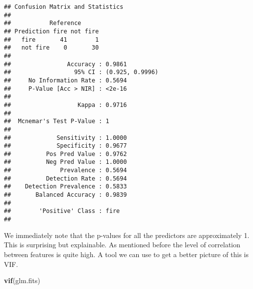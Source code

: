 \documentclass[
]{article}
\newenvironment{Shaded}{\begin{snugshade}}{\end{snugshade}}
\newcommand{\AttributeTok}[1]{\textcolor[rgb]{0.13,0.29,0.53}{#1}}
\newcommand{\CommentTok}[1]{\textcolor[rgb]{0.56,0.35,0.01}{\textit{#1}}}
\newcommand{\DecValTok}[1]{\textcolor[rgb]{0.00,0.00,0.81}{#1}}
\newcommand{\FunctionTok}[1]{\textcolor[rgb]{0.13,0.29,0.53}{\textbf{#1}}}
\newcommand{\NormalTok}[1]{#1}
\newcommand{\OtherTok}[1]{\textcolor[rgb]{0.56,0.35,0.01}{#1}}
\newcommand{\SpecialCharTok}[1]{\textcolor[rgb]{0.81,0.36,0.00}{\textbf{#1}}}
\newcommand{\StringTok}[1]{\textcolor[rgb]{0.31,0.60,0.02}{#1}}
\begin{document}
\begin{Shaded}
\end{Shaded}

\begin{verbatim}
## Confusion Matrix and Statistics
## 
##           Reference
## Prediction fire not fire
##   fire       41        1
##   not fire    0       30
##                                          
##                Accuracy : 0.9861         
##                  95% CI : (0.925, 0.9996)
##     No Information Rate : 0.5694         
##     P-Value [Acc > NIR] : <2e-16         
##                                          
##                   Kappa : 0.9716         
##                                          
##  Mcnemar's Test P-Value : 1              
##                                          
##             Sensitivity : 1.0000         
##             Specificity : 0.9677         
##          Pos Pred Value : 0.9762         
##          Neg Pred Value : 1.0000         
##              Prevalence : 0.5694         
##          Detection Rate : 0.5694         
##    Detection Prevalence : 0.5833         
##       Balanced Accuracy : 0.9839         
##                                          
##        'Positive' Class : fire           
## 
\end{verbatim}

We immediately note that the p-values for all the predictors are
approximately 1. This is surprising but explainable. As mentioned before
the level of correlation between features is quite high. A tool we can
use to get a better picture of this is VIF.

\begin{Shaded}
\begin{Highlighting}[]
\FunctionTok{vif}\NormalTok{(glm.fits)}
\end{Highlighting}
\end{Shaded}
\end{document}

